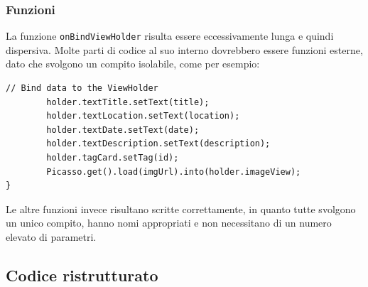 \subsubsection{Funzioni}
La funzione \verb|onBindViewHolder| risulta essere eccessivamente lunga e quindi dispersiva. Molte parti di codice al suo interno dovrebbero essere funzioni esterne, dato che svolgono un compito isolabile, come per esempio:
\begin{verbatim}
// Bind data to the ViewHolder
        holder.textTitle.setText(title);
        holder.textLocation.setText(location);
        holder.textDate.setText(date);
        holder.textDescription.setText(description);
        holder.tagCard.setTag(id);
        Picasso.get().load(imgUrl).into(holder.imageView);
}
\end{verbatim}
Le altre funzioni invece risultano scritte correttamente, in quanto tutte svolgono un unico compito, hanno nomi appropriati e non necessitano di un numero elevato di parametri.

\subsection{Codice ristrutturato}







